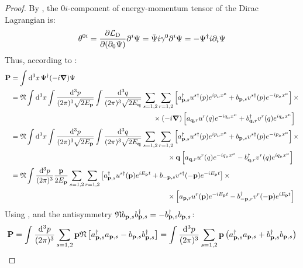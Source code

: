 \begin{proofbox}
  \begin{proof}
    By , the $ 0i $-component of energy-momentum tensor of the Dirac Lagrangian is:
    \begin{equation*}
      \theta^{0i} = \frac{\partial \mathcal{L}_\text{D}}{\partial (\partial_0 \Psi)} \partial^i \Psi = \bar{\Psi} i \gamma^0 \partial^i \Psi = - \Psi^\dagger i \partial_i \Psi
    \end{equation*}
    Thus, according to :
    \begin{equation*}
      \begin{split}
        \mathbf{P}
        &= \int \mathrm{d}^3x\, \Psi^\dagger (-i \boldsymbol{\nabla}) \Psi \\
        &= \mathfrak{N} \int \mathrm{d}^3x \int \frac{\mathrm{d}^3p}{(2\pi)^3 \sqrt{2E_{\mathbf{p}}}} \int \frac{\mathrm{d}^3q}{(2\pi)^3 \sqrt{2E_{\mathbf{q}}}} \sum_{s = 1,2} \sum_{r = 1,2} \left[ a_{\mathbf{p},s}^\dagger u^{s\dagger}(p) e^{i p_\mu x^\mu} + b_{\mathbf{p},s} v^{s\dagger}(p) e^{-ip_\mu x^\mu} \right] \times \\
        & \qquad \qquad \qquad \qquad \qquad \qquad \qquad \qquad \qquad \qquad \times (-i \boldsymbol{\nabla}) \left[ a_{\mathbf{q},r} u^r(q) e^{-i q_\mu x^\mu} + b_{\mathbf{q},r}^\dagger v^r(q) e^{i q_\mu x^\mu} \right] \\
        &= \mathfrak{N} \int \mathrm{d}^3x \int \frac{\mathrm{d}^3p}{(2\pi)^3 \sqrt{2E_{\mathbf{p}}}} \int \frac{\mathrm{d}^3q}{(2\pi)^3 \sqrt{2E_{\mathbf{q}}}} \sum_{s = 1,2} \sum_{r = 1,2} \left[ a_{\mathbf{p},s}^\dagger u^{s\dagger}(p) e^{i p_\mu x^\mu} + b_{\mathbf{p},s} v^{s\dagger}(p) e^{-ip_\mu x^\mu} \right] \times \\
        & \qquad \qquad \qquad \qquad \qquad \qquad \qquad \qquad \qquad \qquad \qquad \times \mathbf{q} \left[ a_{\mathbf{q},r} u^r(q) e^{-i q_\mu x^\mu} - b_{\mathbf{q},r}^\dagger v^r(q) e^{i q_\mu x^\mu} \right] \\
        &= \mathfrak{N} \int \frac{\mathrm{d}^3p}{(2\pi)^3} \frac{\mathbf{p}}{2E_{\mathbf{p}}} \sum_{s = 1,2} \sum_{r = 1,2} \left[ a_{\mathbf{p},s}^\dagger u^{s\dagger}(\mathbf{p}) e^{i E_{\mathbf{p}} t} + b_{-\mathbf{p},s} v^{s\dagger}(-\mathbf{p}) e^{-i E_{\mathbf{p}} t} \right] \times \\
        & \qquad \qquad \qquad \qquad \qquad \qquad \qquad \qquad \qquad \qquad \qquad \times \left[ a_{\mathbf{p},r} u^r(\mathbf{p}) e^{-i E_{\mathbf{p}} t} - b_{-\mathbf{p},r}^\dagger v^r(-\mathbf{p}) e^{i E_{\mathbf{p}} t} \right]
      \end{split}
    \end{equation*}
    Using ,  and the antisymmetry $ \mathfrak{N} b_{\mathbf{p},s} b_{\mathbf{p},s}^\dagger = - b_{\mathbf{p},s}^\dagger b_{\mathbf{p},s} $:
    \begin{equation*}
      \mathbf{P} = \int \frac{\mathrm{d}^3p}{(2\pi)^3} \sum_{s = 1,2} \mathbf{p} \mathfrak{N} \left[ a_{\mathbf{p},s}^\dagger a_{\mathbf{p},s} - b_{\mathbf{p},s} b_{\mathbf{p},s}^\dagger \right] = \int \frac{\mathrm{d}^3p}{(2\pi)^3} \sum_{s = 1,2} \mathbf{p} \left( a_{\mathbf{p},s}^\dagger a_{\mathbf{p},s} + b_{\mathbf{p},s}^\dagger b_{\mathbf{p},s} \right)
    \end{equation*}
  \end{proof}
\end{proofbox}

